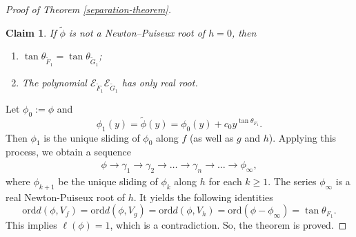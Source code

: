 \documentclass[reqno, 12pt ,a4letter]{amsart}
\newtheorem {claim}{Claim}[section]
\theoremstyle{definition}
\begin{document}
\begin{proof}[Proof of Theorem \ref{separation-theorem}]
\begin{claim}\label{claim3}
	If $\tilde\phi$ is not a Newton--Puiseux root of $h=0$, then
	\begin{enumerate}
		\item $ \tan\theta_{\widetilde{F}_1} = \tan\theta_{\widetilde{G}_1}$;
		\item The polynomial $\mathcal{E}_{\widetilde{F}_1}\mathcal{E}_{\widetilde{G}_1}$ has only real root.
	\end{enumerate}
\end{claim}

Let $\phi_0:=\phi$ and $$\phi_1(y)=\tilde\phi(y) = \phi_0(y) + c_0y^{\tan\theta_{F_1}}.$$ 
Then $\phi_1$ is the unique sliding of $\phi_0$ along $f$ (as well as $g$ and $h$). Applying this process, we obtain a sequence 
\begin{align}
    \phi \to \gamma_1 \to \gamma_2 \to \dots \to \gamma_n \to \dots \to \phi_\infty,
\end{align}
where $\phi_{k+1}$ be the unique sliding of $\phi_k$ along $h$ for each $k\geq 1$. The series $\phi_\infty$ is a real Newton-Puiseux root of $h$. It yields the following identities
$$\mathrm{ord}d(\phi, V_f)=\mathrm{ord}d(\phi, V_g)=\mathrm{ord}d(\phi, V_h)=\mathrm{ord}(\phi-\phi_\infty)=\tan \theta_{F_1}.$$
This implies $\ell(\phi)=1$, which is a contradiction. So, the theorem is proved.
\end{proof}
\end{document}
